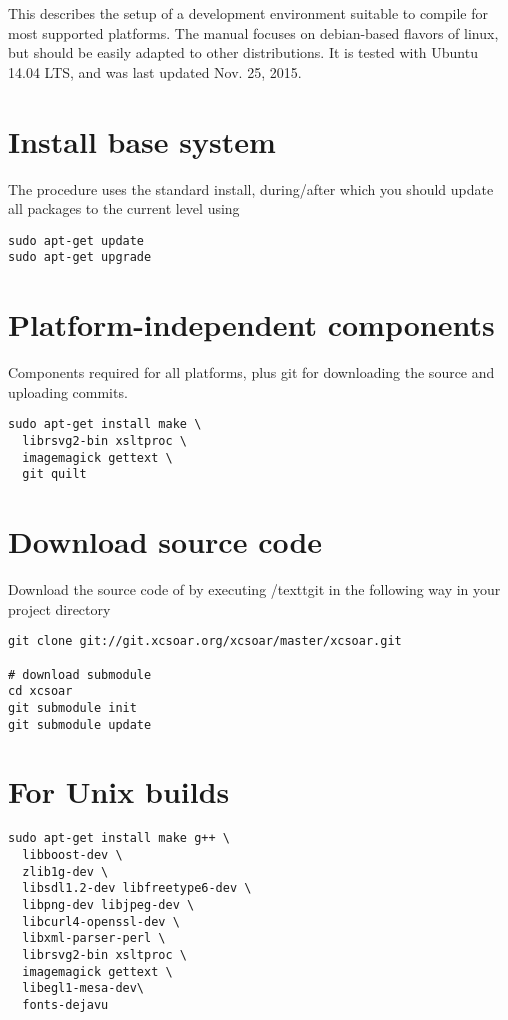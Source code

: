 This describes the setup of a development environment suitable to compile \xc for most supported platforms. The manual focuses on debian-based flavors of linux, but should be easily adapted to other distributions. It is tested with Ubuntu 14.04 LTS, and was last updated Nov. 25, 2015.

\section{Install base system}
The procedure uses the standard install, during/after which you should update all packages to the current level using

\begin{verbatim}
sudo apt-get update
sudo apt-get upgrade
\end{verbatim}

\section{Platform-independent components}

Components required for all platforms, plus git for downloading the source and uploading commits.

\begin{verbatim}
sudo apt-get install make \
  librsvg2-bin xsltproc \
  imagemagick gettext \
  git quilt
\end{verbatim}

\section{Download source code}

Download the source code of \xc by executing /textt{git} in the following way in your project directory
\begin{verbatim}
git clone git://git.xcsoar.org/xcsoar/master/xcsoar.git

# download submodule
cd xcsoar
git submodule init
git submodule update
\end{verbatim}


\section{For Unix builds}
\begin{verbatim}
sudo apt-get install make g++ \
  libboost-dev \
  zlib1g-dev \
  libsdl1.2-dev libfreetype6-dev \
  libpng-dev libjpeg-dev \
  libcurl4-openssl-dev \
  libxml-parser-perl \
  librsvg2-bin xsltproc \
  imagemagick gettext \
  libegl1-mesa-dev\
  fonts-dejavu
\end{verbatim}

